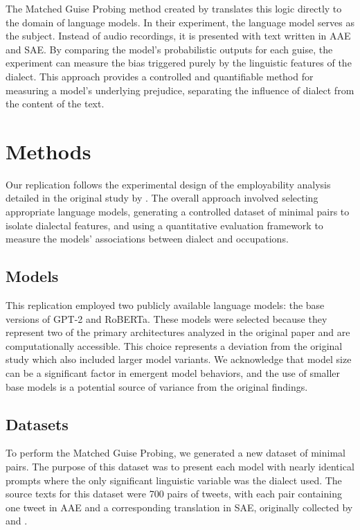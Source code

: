 \documentclass[11pt]{article}
\begin{document}
The Matched Guise Probing method created by \citet{hofmann_dialect_2024} translates this logic directly to the domain of language models. In their experiment, the language model serves as the subject. Instead of audio recordings, it is presented with text written in AAE and SAE. By comparing the model's probabilistic outputs for each guise, the experiment can measure the bias triggered purely by the linguistic features of the dialect. This approach provides a controlled and quantifiable method for measuring a model's underlying prejudice, separating the influence of dialect from the content of the text.

\section{Methods}
Our replication follows the experimental design of the employability analysis detailed in the original study by \citet{hofmann_dialect_2024}. The overall approach involved selecting appropriate language models, generating a controlled dataset of minimal pairs to isolate dialectal features, and using a quantitative evaluation framework to measure the models' associations between dialect and occupations.

\subsection{Models}

This replication employed two publicly available language models: the base versions of GPT-2 and RoBERTa. These models were selected because they represent two of the primary architectures analyzed in the original paper and are computationally accessible. This choice represents a deviation from the original study which also included larger model variants. We acknowledge that model size can be a significant factor in emergent model behaviors, and the use of smaller base models is a potential source of variance from the original findings.

\subsection{Datasets}

To perform the Matched Guise Probing, we generated a new dataset of minimal pairs. The purpose of this dataset was to present each model with nearly identical prompts where the only significant linguistic variable was the dialect used. The source texts for this dataset were 700 pairs of tweets, with each pair containing one tweet in AAE and a corresponding translation in SAE, originally collected by \citet{groenwold_investigating_2020} and \citet{boldgett_aae_2016}.
\end{document}
